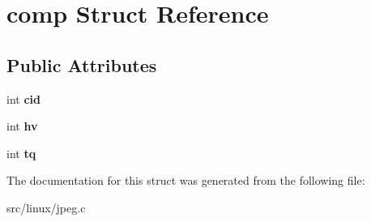 \hypertarget{structcomp}{\section{comp \-Struct \-Reference}
\label{structcomp}
}
\subsection*{\-Public \-Attributes}
\begin{DoxyCompactItemize}
\item 
\hypertarget{structcomp_a8a13b7d6171a6411afc68ab9c6cd792d}{int {\bfseries cid}}\label{structcomp_a8a13b7d6171a6411afc68ab9c6cd792d}

\item 
\hypertarget{structcomp_ae9b94231445da3c4fce322ae12cd82a8}{int {\bfseries hv}}\label{structcomp_ae9b94231445da3c4fce322ae12cd82a8}

\item 
\hypertarget{structcomp_a4fb10c419453e686d29787651ba299dc}{int {\bfseries tq}}\label{structcomp_a4fb10c419453e686d29787651ba299dc}

\end{DoxyCompactItemize}


\-The documentation for this struct was generated from the following file\-:\begin{DoxyCompactItemize}
\item 
src/linux/jpeg.\-c\end{DoxyCompactItemize}
